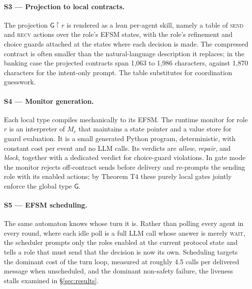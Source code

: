 \documentclass{article}
\newcommand{\gtG}{\mathsf{G}}
\newcommand{\proj}[2]{#1\!\upharpoonright\!#2}
\begin{document}
\paragraph{S3 --- Projection to local contracts.} The projection $\proj{\gtG}{r}$ is rendered as a lean per-agent skill, namely a table of \textsc{send} and \textsc{recv} actions over the role's EFSM states, with the role's refinement and choice guards attached at the states where each decision is made. The compressed contract is often smaller than the natural-language description it replaces; in the banking case the projected contracts span 1{,}063 to 1{,}986 characters, against 1{,}870 characters for the intent-only prompt. The table substitutes for coordination guesswork.

\paragraph{S4 --- Monitor generation.} Each local type compiles mechanically to its EFSM. The runtime monitor for role $r$ is an interpreter of $M_r$ that maintains a state pointer and a value store for guard evaluation. It is a small generated Python program, deterministic, with constant cost per event and no LLM calls. Its verdicts are \emph{allow}, \emph{repair}, and \emph{block}, together with a dedicated verdict for choice-guard violations. In gate mode the monitor rejects off-contract sends before delivery and re-prompts the sending role with its enabled actions; by Theorem T4 these purely local gates jointly enforce the global type $\gtG$.

\paragraph{S5 --- EFSM scheduling.} The same automaton knows whose turn it is. Rather than polling every agent in every round, where each idle poll is a full LLM call whose answer is merely \textsc{wait}, the scheduler prompts only the roles enabled at the current protocol state and tells a role that must send that the decision is now its own. Scheduling targets the dominant cost of the turn loop, measured at roughly 4.5 calls per delivered message when unscheduled, and the dominant non-safety failure, the liveness stalls examined in \S\ref{sec:results}.
\end{document}
